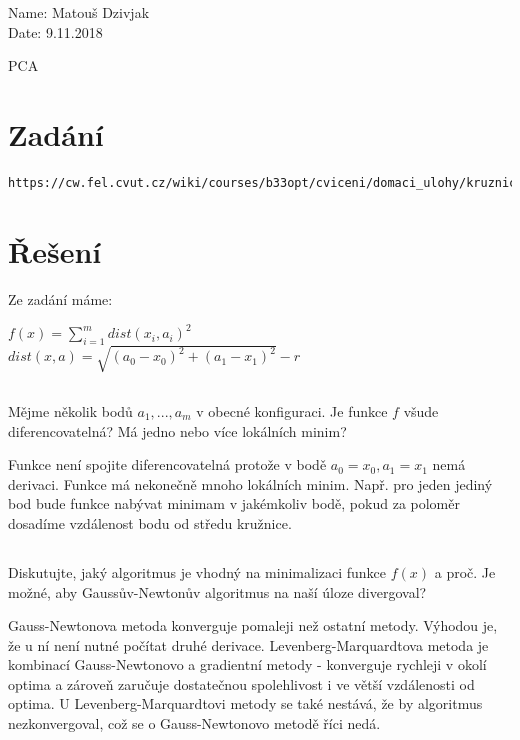 \documentclass[10pt,a4paper,openright]{article}
\begin{document}
	\begin{flushleft}
		\large Name: Matouš Dzivjak\\
		\large Date: 9.11.2018\\
	\end{flushleft}
\begin{center}
	\huge PCA
\end{center}
\section{Zadání}
\begin{verbatim}
https://cw.fel.cvut.cz/wiki/courses/b33opt/cviceni/domaci_ulohy/kruznice/start
\end{verbatim}


\section{Řešení}

Ze zadání máme:
\begin{center}
$f(x) = \sum_{i=1}^{m}dist(x_i,a_i)^2$\\
\vspace{5mm}
$dist(x,a) = \sqrt{(a_0 - x_0)^2 + (a_1 - x_1)^2} - r$
\end{center}

\subsection{}
Mějme několik bodů $a_1,...,a_m$ v obecné konfiguraci.
Je funkce $f$ všude diferencovatelná? 
Má jedno nebo více lokálních minim?

Funkce není spojite diferencovatelná protože v bodě $a_0 = x_0, a_1 = x_1$ nemá derivaci.
Funkce má nekonečně mnoho lokálních minim. Např. pro jeden jediný bod
bude funkce nabývat minimam v jakémkoliv bodě, pokud za poloměr dosadíme vzdálenost bodu
od středu kružnice.

\subsection{}
Diskutujte, jaký algoritmus je vhodný na minimalizaci funkce $f(x)$ a proč.
Je možné, aby Gaussův-Newtonův algoritmus na naší úloze divergoval?

Gauss-Newtonova metoda konverguje pomaleji než ostatní metody.
Výhodou je, že u ní není nutné počítat druhé derivace. 
Levenberg-Marquardtova metoda je kombinací Gauss-Newtonovo a gradientní
metody - konverguje rychleji v okolí optima a zároveň zaručuje dostatečnou
spolehlivost i ve větší vzdálenosti od optima. U Levenberg-Marquardtovi metody
se také nestává, že by algoritmus nezkonvergoval, což se o Gauss-Newtonovo metodě
říci nedá.
\end{document}
